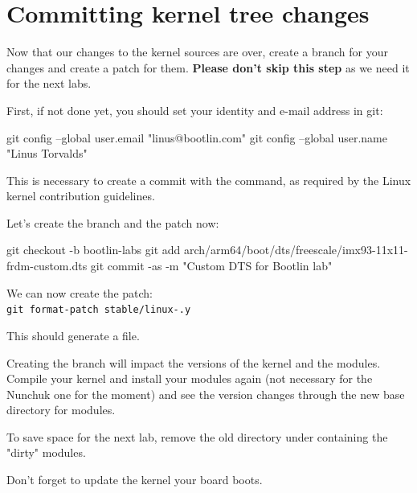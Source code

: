 \section{Committing kernel tree changes}

Now that our changes to the kernel sources are over,
create a branch for your changes and create a patch for them.
{\bf Please don't skip this step} as we need it for the next labs.

First, if not done yet, you should set your identity
and e-mail address in git:

\begin{bashinput}
git config --global user.email "linus@bootlin.com"
git config --global user.name "Linus Torvalds"
\end{bashinput}

This is necessary to create a commit with the 
command, as required by the Linux kernel contribution guidelines.

Let's create the branch and the patch now:

\begin{bashinput}
git checkout -b bootlin-labs
git add arch/arm64/boot/dts/freescale/imx93-11x11-frdm-custom.dts
git commit -as -m "Custom DTS for Bootlin lab"
\end{bashinput}

We can now create the patch:\\
\texttt{git format-patch stable/linux-\workingkernel.y}

This should generate a 
file.

Creating the branch will impact the versions of the kernel and the modules.
Compile your kernel and install your modules again (not necessary for the
Nunchuk one for the moment) and see the version changes through the
new base directory for modules.

To save space for the next lab, remove the old directory under
 containing the "dirty" modules.

Don't forget to update the kernel your board boots.
